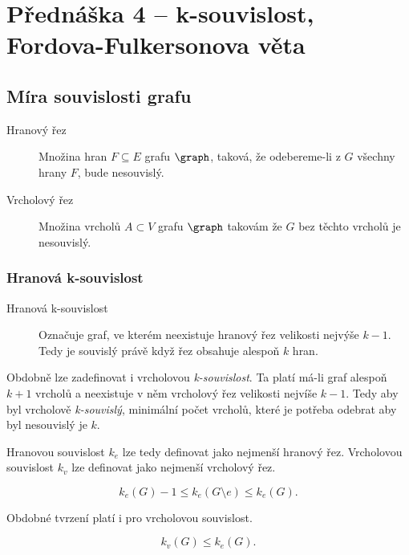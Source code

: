 \section{Přednáška 4 -- k-souvislost, Fordova-Fulkersonova věta}

\subsection{Míra souvislosti grafu}

\begin{description}
    \item[Hranový řez] Množina hran $F \subseteq E$ grafu $\graph$, taková, že odebereme-li z $G$ všechny hrany $F$, bude nesouvislý.
    \item[Vrcholový řez] Množina vrcholů $A \subset V$ grafu $\graph$ takovám že $G$ bez těchto vrcholů je nesouvislý.
\end{description}

\subsubsection{Hranová k-souvislost}

\begin{description}
    \item[Hranová k-souvislost] Označuje graf, ve kterém neexistuje hranový řez velikosti nejvýše $k-1$.
    Tedy je souvislý právě když řez obsahuje alespoň $k$ hran.
\end{description}

Obdobně lze zadefinovat i vrcholovou \textit{k-souvislost}.
Ta platí má-li graf alespoň $k+1$ vrcholů a neexistuje v něm vrcholový řez velikosti nejvíše $k-1$.
Tedy aby byl vrcholově \textit{k-souvislý}, minimální počet vrcholů, které je potřeba odebrat aby byl nesouvislý je $k$.

\medskip

Hranovou souvislost $k_e$ lze tedy definovat jako nejmenší hranový řez.
Vrcholovou souvislost $k_v$ lze definovat jako nejmenší vrcholový řez.


\[
    k_e(G) - 1 \leq k_e(G \setminus e) \leq k_e(G) \text{.}
\]

Obdobné tvrzení platí i pro vrcholovou souvislost.


\[
    k_v(G) \leq k_e(G) \text{.}
\]

